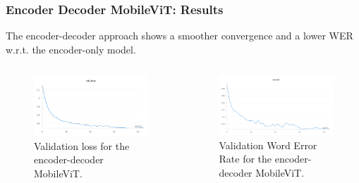 \documentclass[english, xcolor={table}]{beamer}
\begin{document}
\begin{frame}
  \frametitle{Encoder Decoder MobileViT: Results}

  The encoder-decoder approach shows a \alert{smoother} convergence and a lower WER w.r.t. the encoder-only model.

  \begin{columns}
    \begin{column}{0.5\textwidth}
      \begin{figure}
        \centering
        \includegraphics[width=1\textwidth]{figures/loss_encdec.png}
        \caption{Validation loss for the encoder-decoder MobileViT.}
      \end{figure}
    \end{column}
    \begin{column}{0.5\textwidth}
      \begin{figure}
        \centering
        \includegraphics[width=1\textwidth]{figures/wer_encdec.png}
        \caption{Validation Word Error Rate for the encoder-decoder MobileViT.}
      \end{figure}
    \end{column}
  \end{columns}
\end{frame}
\end{document}
